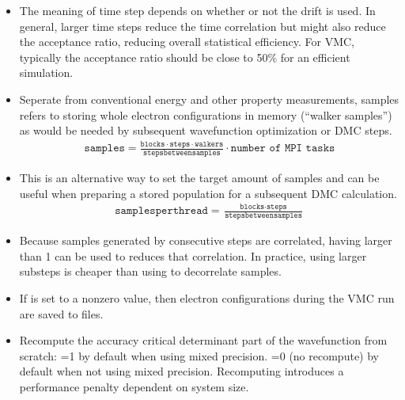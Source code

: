 \documentclass[letterpaper,10pt,english]{sphinxmanual}
\begin{document}
\begin{itemize}
\item {} 
 The meaning of time step depends on whether or not
the drift is used. In general, larger time steps reduce the
time correlation but might also reduce the acceptance ratio,
reducing overall statistical efficiency. For VMC, typically the
acceptance ratio should be close to 50\% for an efficient
simulation.

\item {} 
 Seperate from conventional energy and other
property measurements, samples refers to storing whole electron
configurations in memory (“walker samples”) as would be needed by subsequent
wavefunction optimization or DMC steps. 
\begin{equation*}
\begin{split}\texttt{samples}=
\frac{\texttt{blocks}\cdot\texttt{steps}\cdot\texttt{walkers}}{\texttt{stepsbetweensamples}}\cdot\texttt{number of MPI tasks}\end{split}
\end{equation*}
\item {} 
 This is an alternative way to set the target amount of samples and can be useful when preparing a stored population for a subsequent DMC calculation.
\begin{equation*}
\begin{split}\texttt{samplesperthread}=
\frac{\texttt{blocks}\cdot\texttt{steps}}{\texttt{stepsbetweensamples}}\end{split}
\end{equation*}
\item {} 
 Because samples generated by consecutive steps are correlated, having  larger than 1 can be used to reduces that correlation. In practice, using larger substeps is cheaper than using  to decorrelate samples.

\item {} 
 If  is set to a nonzero value, then electron configurations during the VMC run are saved to files.

\item {} 
 Recompute the accuracy critical determinant part of the wavefunction
from scratch: =1 by default when using mixed precision. =0 (no
recompute) by default when not using mixed precision. Recomputing
introduces a performance penalty dependent on system size.

\end{itemize}
\end{document}
